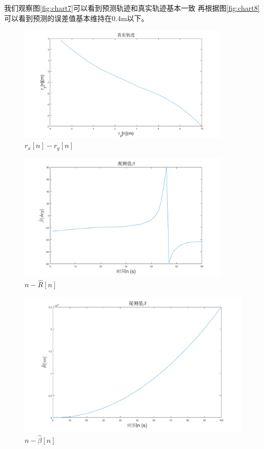 \documentclass{article}
\begin{document}
我们观察图\ref{fig:chart7}可以看到预测轨迹和真实轨迹基本一致
再根据图\ref{fig:chart8}可以看到预测的误差值基本维持在0.4m以下。
\begin{figure}
    \centering
    \includegraphics[width = 0.9\textwidth]{imgs/1.png}
    \caption{$r_x[n]-r_y[n]$}
    \label{fig:chart1}
\end{figure}
\begin{figure}
    \centering
    \includegraphics[width = 0.9\textwidth]{imgs/2.png}
    \caption{$n-\hat{R}[n]$}
    \label{fig:chart2}
\end{figure}
\begin{figure}
    \centering
    \includegraphics[width = \textwidth]{imgs/3.png}
    \caption{$n-\hat{\beta}[n]$}
    \label{fig:chart3}
\end{figure}
\end{document}

